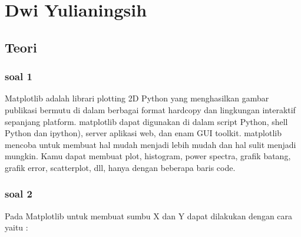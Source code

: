 \section{Dwi Yulianingsih}
\subsection{Teori}
\subsubsection{soal 1}
Matplotlib adalah librari plotting 2D Python yang menghasilkan gambar  publikasi bermutu di dalam berbagai format hardcopy dan lingkungan interaktif sepanjang platform. matplotlib dapat digunakan di dalam script Python, shell Python dan ipython), server aplikasi web, dan enam GUI toolkit. matplotlib mencoba untuk membuat hal mudah menjadi lebih mudah dan hal sulit menjadi mungkin. Kamu dapat membuat plot, histogram, power spectra, grafik batang, grafik error, scatterplot, dll, hanya dengan beberapa baris code.

\subsubsection{soal 2}
Pada Matplotlib untuk membuat sumbu X dan Y dapat dilakukan dengan cara yaitu :


